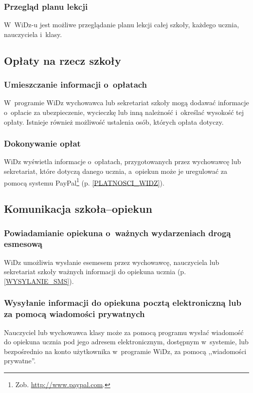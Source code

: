 \documentclass[12pt,leqno,twoside]{mwart}
\begin{document}
\subsubsection{Przegląd planu lekcji}
\noindent W~WiDz-u jest możliwe przeglądanie planu lekcji całej szkoły, każdego ucznia, nauczyciela i~klasy.

\subsection{Opłaty na rzecz szkoły}
\subsubsection{Umieszczanie informacji o~opłatach}
\noindent W~programie WiDz wychowawca lub sekretariat szkoły mogą dodawać informacje o~opłacie za ubezpieczenie, wycieczkę lub inną należność i~określać wysokość tej opłaty. Istnieje również możliwość ustalenia osób, których opłata dotyczy.

\subsubsection{Dokonywanie opłat}
\noindent WiDz wyświetla informacje o~opłatach, przygotowanych przez wychowawcę lub sekretariat, które dotyczą danego ucznia, a~opiekun może je uregulować za pomocą systemu PayPal\footnote{Zob. \url{http://www.paypal.com}.} (p. \ref{PLATNOSCI_WIDZ}). 

\subsection{Komunikacja szkoła--opiekun}
\subsubsection{Powiadamianie opiekuna o~ważnych wydarzeniach drogą esmesową}
\noindent WiDz umożliwia wysłanie esemesem przez wychowawcę, nauczyciela lub sekretariat szkoły ważnych informacji do opiekuna ucznia  (p. \ref{WYSYLANIE_SMS}).

\subsubsection{Wysyłanie informacji do opiekuna pocztą elektroniczną lub za pomocą wiadomości prywatnych}
\noindent Nauczyciel lub wychowawca klasy może za pomocą programu wysłać wiadomość do opiekuna ucznia pod jego adresem elektronicznym, dostępnym w~systemie, lub bezpośrednio na konto użytkownika w~programie WiDz, za pomocą ,,wiadomości prywatne''.
\end{document}
